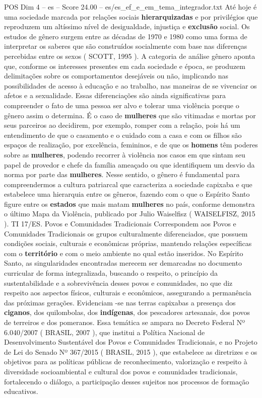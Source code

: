 \begin{textsample}{POS Dim 4 – es – Score 24.00 – es/es\_ef\_e\_em\_tema\_integrador.txt}
Até hoje é uma sociedade marcada por relações sociais \textbf{hierarquizadas} e por privilégios que reproduzem um altíssimo nível de desigualdade, injustiça e \textbf{exclusão} social.
Os estudos de gênero surgem entre as décadas de 1970 e 1980 como uma forma de interpretar os saberes que são construídos socialmente com base nas diferenças percebidas entre os sexos ( SCOTT, 1995 ).
A categoria de análise gênero aponta que, conforme os interesses presentes em cada sociedade e época, se produzem delimitações sobre os comportamentos desejáveis ou não, implicando nas possibilidades de acesso à educação e ao trabalho, nas maneiras de se vivenciar os afetos e a sexualidade.
Essas diferenciações são ainda significativas para compreender o fato de uma pessoa ser alvo e tolerar uma violência porque o gênero assim o determina.
É o caso de \textbf{mulheres} que são vitimadas e mortas por seus parceiros ao decidirem, por exemplo, romper com a relação, pois há um entendimento de que o casamento e o cuidado com a casa e com os filhos são espaços de realização, por excelência, femininos, e de que os \textbf{homens} têm poderes sobre as \textbf{mulheres}, podendo recorrer à violência nos casos em que sintam seu papel de provedor e chefe da família ameaçado ou que identifiquem um desvio da norma por parte das \textbf{mulheres}.
Nesse sentido, o gênero é fundamental para compreendermos a cultura patriarcal que caracteriza a sociedade capixaba e que estabelece uma hierarquia entre os gêneros, fazendo com o que o Espírito Santo figure entre os \textbf{estados} que mais matam \textbf{mulheres} no país, conforme demonstra o último Mapa da Violência, publicado por Julio Waiselfisz ( WAISELFISZ, 2015 ).
TI 17/ES.
Povos e Comunidades Tradicionais Correspondem aos Povos e Comunidades Tradicionais os grupos culturalmente diferenciados, que possuem condições sociais, culturais e econômicas próprias, mantendo relações específicas com o \textbf{território} e com o meio ambiente no qual estão inseridos.
No Espírito Santo, as singularidades encontradas merecem ser demarcadas no documento curricular de forma integralizada, buscando o respeito, o princípio da sustentabilidade e a sobrevivência desses povos e comunidades, no que diz respeito aos aspectos físicos, culturais e econômicos, assegurando a permanência das próximas gerações.
Evidenciam -se nas terras capixabas a presença dos \textbf{ciganos}, dos quilombolas, dos \textbf{indígenas}, dos pescadores artesanais, dos povos de terreiros e dos pomeranos.
Essa temática se ampara no Decreto Federal Nº 6.040/2007 ( BRASIL, 2007 ), que institui a Política Nacional de Desenvolvimento Sustentável dos Povos e Comunidades Tradicionais, e no Projeto de Lei do Senado Nº 367/2015 ( BRASIL, 2015 ), que estabelece as diretrizes e os objetivos para as políticas públicas de reconhecimento, valorização e respeito à diversidade socioambiental e cultural dos povos e comunidades tradicionais, fortalecendo o diálogo, a participação desses sujeitos nos processos de formação educativos.

\end{textsample}
